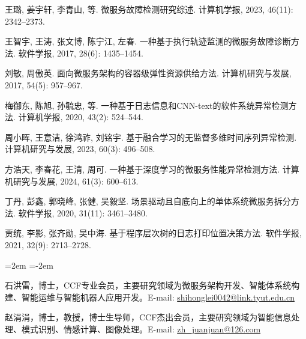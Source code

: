 \documentclass{rjthesis}
\begin{document}
{\begin{description}[font=\normalfont,labelwidth=2em,leftmargin=2.5em,nosep]
\item[{[26]}] 王璐, 姜宇轩, 李青山, 等. 微服务故障检测研究综述. 计算机学报, 2023, 46(11): 2342--2373.
\item[{[27]}] 王智宇, 王涛, 张文博, 陈宁江, 左春. 一种基于执行轨迹监测的微服务故障诊断方法. 软件学报, 2017, 28(6): 1435--1454.
\item[{[32]}] 刘敏, 周傲英. 面向微服务架构的容器级弹性资源供给方法. 计算机研究与发展, 2017, 54(5): 957--967.
\item[{[39]}] 梅御东, 陈旭, 孙毓忠, 等. 一种基于日志信息和CNN-text的软件系统异常检测方法. 计算机学报, 2020, 43(2): 524--544.
\item[{[43]}] 周小晖, 王意洁, 徐鸿祚, 刘铭宇. 基于融合学习的无监督多维时间序列异常检测. 计算机研究与发展, 2023, 60(3): 496--508.
\item[{[44]}] 方浩天, 李春花, 王清, 周可. 一种基于深度学习的微服务性能异常检测方法. 计算机研究与发展, 2024, 61(3): 600--613.
\item[{[48]}] 丁丹, 彭鑫, 郭晓峰, 张健, 吴毅坚. 场景驱动且自底向上的单体系统微服务拆分方法. 软件学报, 2020, 31(11): 3461--3480.
\item[{[49]}] 贾统, 李影, 张齐勋, 吴中海. 基于程序层次树的日志打印位置决策方法. 软件学报, 2021, 32(9): 2713--2728.
\end{description}
}

\vspace{0.5em}

\begingroup
\fontsize{7.5pt}{11.5pt}\selectfont
\begin{list}{}{%
  \leftmargin=2em
  \itemindent=-2em
  \parsep=0pt
  \itemsep=4pt
  \topsep=0pt
}
\item {\hei 石洪雷}，博士，CCF专业会员，主要研究领域为微服务架构开发、智能体系统构建、智能运维与智能机器人应用开发。E-mail: \url{shihonglei0042@link.tyut.edu.cn}
\item {\hei 赵涓涓}，博士，教授，博士生导师，CCF杰出会员，主要研究领域为智能信息处理、模式识别、情感计算、图像处理。E-mail: \url{zh_juanjuan@126.com}
\end{list}
\endgroup
\end{document}

